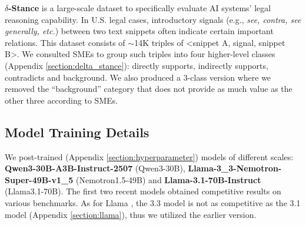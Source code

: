 \textbf{$\delta$-Stance} \cite{DBLP:conf/acl/GuptaR025} is a large-scale dataset to specifically evaluate AI systems' legal reasoning capability. In U.S. legal cases, introductory signals (e.g., \textit{see, contra, see generally, etc.}) between two text snippets often indicate certain important relations. This dataset consists of $\sim$14K triples of <snippet A, signal, snippet B>. We consulted SMEs to group such triples into four higher-level classes (Appendix \ref{section:delta_stance}): directly supports, indirectly supports, contradicts and background. We also produced a 3-class version where we removed the ``background'' category that does not provide as much value as the other three according to SMEs.


\subsection{Model Training Details}
\label{section:model_training_details}

We post-trained (Appendix \ref{section:hyperparameter}) models of different scales: \textbf{Qwen3-30B-A3B-Instruct-2507} (Qwen3-30B), \textbf{
Llama-3\_3-Nemotron-Super-49B-v1\_5} (Nemotron1.5-49B) and \textbf{Llama-3.1-70B-Instruct} (Llama3.1-70B). The first two recent models obtained competitive results on various benchmarks. As for Llama \cite{DBLP:journals/corr/abs-2407-21783}, the 3.3 model is not as competitive as the 3.1 model (Appendix \ref{section:llama}), thus we utilized the earlier version.

